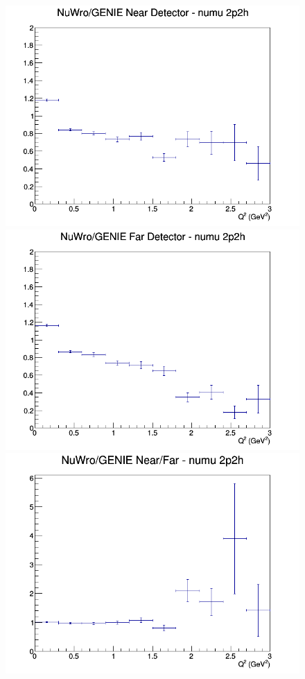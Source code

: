 \documentclass[12pt]{article}
\begin{document}
\begin{figure}[h]
\endminipage
\newline
{}
\includegraphics[width=\linewidth]{eff_Q2/LAr/ratios/2p2h_NuWro_GENIE_numu_near_Q2.png}
\endminipage
{}
\includegraphics[width=\linewidth]{eff_Q2/LAr/ratios/2p2h_NuWro_GENIE_numu_far_Q2.png}
\endminipage
{}
\includegraphics[width=\linewidth]{eff_Q2/LAr/ratios/2p2h_NuWro_GENIE_numu_NF_Q2.png}
\endminipage
\newline
\end{figure}
\clearpage
\end{document}
